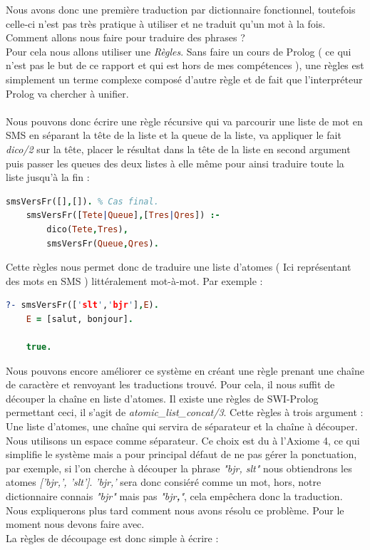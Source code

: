 \documentclass[11pt]{report}
\begin{document}
	Nous avons donc une première traduction par dictionnaire fonctionnel, toutefois celle-ci n'est pas très pratique à utiliser et ne traduit qu'un mot à la fois. Comment allons nous faire pour traduire des phrases ?\\
	Pour cela nous allons utiliser une {\em Règles}. Sans faire un cours de Prolog ( ce qui n'est pas le but de ce rapport et qui est hors de mes compétences ), une règles est simplement un terme complexe composé d'autre règle et de fait que l’interpréteur Prolog va chercher à unifier.
	\paragraph{}
	Nous pouvons donc écrire une règle récursive qui va parcourir une liste de mot en SMS en séparant la tête de la liste et la queue de la liste, va appliquer le fait {\em dico/2} sur la tête, placer le résultat dans la tête de la liste en second argument puis passer les queues des deux listes à elle même pour ainsi traduire toute la liste jusqu'à la fin :
	
	\begin{lstlisting}[language=Prolog]
	smsVersFr([],[]). % Cas final.
	smsVersFr([Tete|Queue],[Tres|Qres]) :-
		dico(Tete,Tres),  
		smsVersFr(Queue,Qres).
	\end{lstlisting}
	
	Cette règles nous permet donc de traduire une liste d'atomes ( Ici représentant des mots en SMS ) littéralement mot-à-mot. Par exemple :
	
	\begin{lstlisting}[language=Prolog]
	?- smsVersFr(['slt','bjr'],E). 
	E = [salut, bonjour].
	
	true.
	\end{lstlisting}
	
	Nous pouvons encore améliorer ce système en créant une règle prenant une chaîne de caractère et renvoyant les traductions trouvé. Pour cela, il nous suffit de découper la chaîne en liste d'atomes. Il existe une règles de SWI-Prolog permettant ceci, il s'agit de {\em atomic\_list\_concat/3}. Cette règles à trois argument : Une liste d'atomes, une chaîne qui servira de séparateur et la chaîne à découper. Nous utilisons un espace comme séparateur. Ce choix est du à l'Axiome 4, ce qui simplifie le système mais a pour principal défaut de ne pas gérer la ponctuation, par exemple, si l'on cherche à découper la phrase {\em "bjr, slt"} nous obtiendrons les atomes {\em ['bjr,', 'slt']}. {\em 'bjr,'} sera donc consiéré comme un mot, hors, notre dictionnaire connais {\em "bjr"} mais pas {\em "bjr\textbf{,}"}, cela empêchera donc la traduction. Nous expliquerons plus tard comment nous avons résolu ce problème. Pour le moment nous devons faire avec.\\
	La règles de découpage est donc simple à écrire :
	
\end{document}
